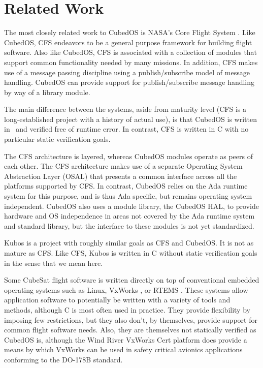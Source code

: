 \section{Related Work}
\label{sec:introduction-related-work}

The most closely related work to CubedOS is NASA's Core Flight System \cite{cFE}. Like CubedOS,
CFS endeavors to be a general purpose framework for building flight software. Also like CubedOS,
CFS is associated with a collection of modules that support common functionality needed by many
missions. In addition, CFS makes use of a message passing discipline using a publish/subscribe
model of message handling. CubedOS can provide support for publish/subscribe message handling by
way of a library module.

The main difference between the systems, aside from maturity level (CFS is a long-established
project with a history of actual use), is that CubedOS is written in \SPARK\ and verified free
of runtime error. In contrast, CFS is written in C with no particular static verification goals.

The CFS architecture is layered, whereas CubedOS modules operate as peers of each other. The CFS
architecture makes use of a separate Operating System Abstraction Layer (OSAL) that presents a
common interface across all the platforms supported by CFS. In contrast, CubedOS relies on the
Ada runtime system for this purpose, and is thus Ada specific, but remains operating system
independent. CubedOS also uses a module library, the CubedOS HAL, to provide hardware and OS
independence in areas not covered by the Ada runtime system and standard library, but the
interface to these modules is not yet standardized.

Kubos \cite{kubos} is a project with roughly similar goals as CFS and CubedOS. It is not as
mature as CFS. Like CFS, Kubos is written in C without static verification goals in the sense
that we mean here.

Some CubeSat flight software is written directly on top of conventional embedded operating
systems such as Linux, VxWorks \cite{vxworks}, or RTEMS \cite{rtems}. These systems allow
application software to potentially be written with a variety of tools and methods, although C
is most often used in practice. They provide flexibility by imposing few restrictions, but they
also don't, by themselves, provide support for common flight software needs. Also, they are
themselves not statically verified as CubedOS is, although the Wind River VxWorks Cert platform
\cite{vxworks-cert} does provide a means by which VxWorks can be used in safety critical
avionics applications conforming to the DO-178B standard.

